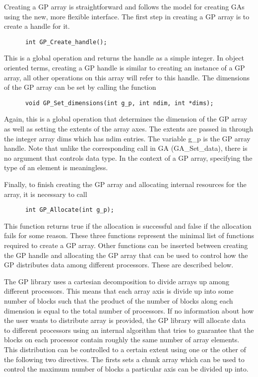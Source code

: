 Creating a GP array is straightforward and follows the model for creating GAs
using the new, more flexible interface. The first step in creating a GP array is
to create a handle for it.

\begin{verbatim}
      int GP_Create_handle();
\end{verbatim}

\noindent
This is a global operation and returns the handle as a simple integer. In object
oriented terms, creating a GP handle is similar to creating an instance of a GP
array, all other operations on this array will refer to this handle. The
dimensions of the GP array can be set by calling the function
 
\begin{verbatim}
      void GP_Set_dimensions(int g_p, int ndim, int *dims);
\end{verbatim}

\noindent
Again, this is a global operation that determines the dimension of the GP array
as well as setting the extents of the array axes. The extents are passed in
through the integer array dims which has ndim entries. The variable g\_p is the
GP array handle. Note that unlike the corresponding call in GA (GA\_Set\_data),
there is no argument that controls data type. In the context of a GP array,
specifying the type of an element is meaningless.

Finally, to finish creating the GP array and allocating internal resources for
the array, it is necessary to call
 
\begin{verbatim}
      int GP_Allocate(int g_p);
\end{verbatim}

\noindent
This function returns true if the allocation is successful and false if the
allocation fails for some reason. These three functions represent the minimal
list of functions required to create a GP array. Other functions can be inserted
between creating the GP handle and allocating the GP array that can be used to
control how the GP distributes data among different processors. These are
described below.
 
The GP library uses a cartesian decomposition to divide arrays up among
different processors. This means that each array axis is divide up into some
number of blocks such that the product of the number of blocks along each
dimension is equal to the total number of processors.
If no information about how the user wants to distribute array is provided, the
GP library will allocate data to different processors using an internal
algorithm that tries to guarantee that the blocks on each processor  contain
roughly the same number of array elements. This distribution can be controlled
to a certain extent using one or the other of the following two directives.
The firsts sets a chunk array which can be used to control the maximum number of
blocks a particular axis can be divided up into.

